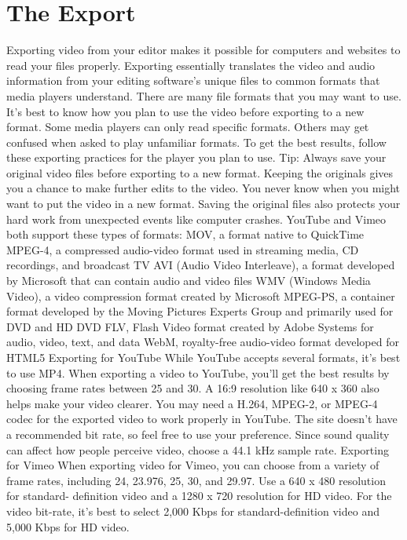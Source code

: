 \section{The Export}
Exporting video from your editor makes it possible for computers and websites to read your files properly. Exporting essentially translates the video and audio information from your editing software's unique files to common formats that media players understand.
There are many file formats that you may want to use. It's best to know how you plan to use the video before exporting to a new format. Some media players can only read specific formats. Others may get confused when asked to play unfamiliar formats.
To get the best results, follow these exporting practices for the player you plan to use.
Tip: Always save your original video files before exporting to a new format. Keeping the originals gives you a chance to make further edits to the video. You never know when you might want to put the video in a new format. Saving the original files also protects your hard work from unexpected events like computer crashes.
YouTube and Vimeo both support these types of formats:
MOV, a format native to QuickTime
MPEG-4, a compressed audio-video format used in streaming media, CD recordings, and broadcast TV
AVI (Audio Video Interleave), a format developed by Microsoft that can contain audio and video files
WMV (Windows Media Video), a video compression format created by Microsoft
MPEG-PS, a container format developed by the Moving Pictures Experts Group and primarily used for DVD and HD DVD
FLV, Flash Video format created by Adobe Systems for audio, video, text, and data
WebM, royalty-free audio-video format developed for HTML5
Exporting for YouTube
While YouTube accepts several formats, it's best to use MP4. When exporting a video to YouTube, you'll get the best results by choosing frame rates between 25 and 30. A 16:9 resolution like 640 x 360 also helps make your video clearer. You may need a H.264, MPEG-2, or MPEG-4 codec for the exported video to work properly in YouTube.
The site doesn't have a recommended bit rate, so feel free to use your preference. Since sound quality can affect how people perceive video, choose a 44.1 kHz sample rate.
Exporting for Vimeo
When exporting video for Vimeo, you can choose from a variety of frame rates, including 24, 23.976, 25, 30, and 29.97. Use a 640 x 480 resolution for standard- definition video and a 1280 x 720 resolution for HD video. For the video bit-rate, it's best to select 2,000 Kbps for standard-definition video and 5,000 Kbps for HD video.
